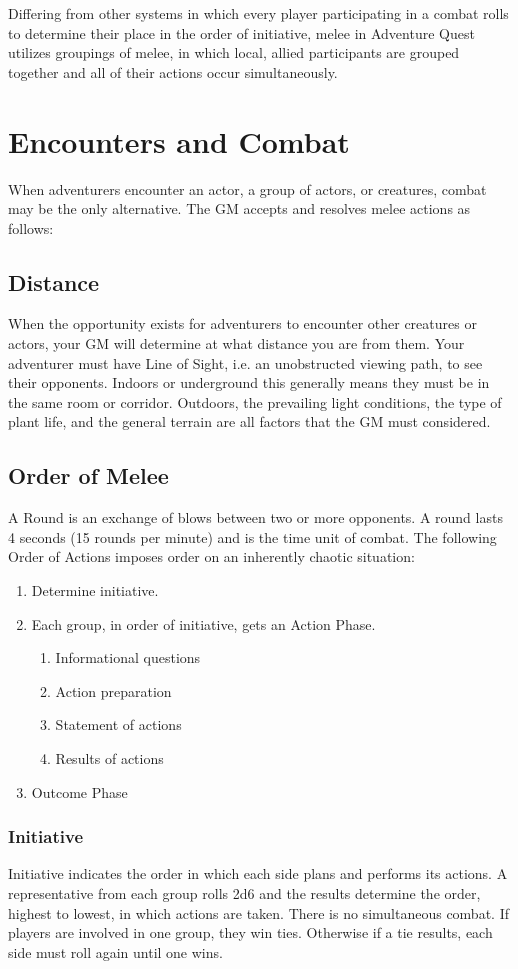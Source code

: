 Differing from other systems in which every player participating in a combat rolls to determine their place in the order of initiative, melee in Adventure Quest utilizes groupings of melee, in which local, allied participants are grouped together and all of their actions occur simultaneously.
\section{Encounters and Combat}
\label{encounter}
When adventurers encounter an actor, a group of actors, or creatures, combat may be the only alternative. The GM accepts and resolves melee actions as follows:
\subsection{Distance}

When the opportunity exists for adventurers to encounter other creatures or actors, your GM will determine at what distance you are from them. Your adventurer must have Line of Sight, i.e. an unobstructed viewing path, to see their opponents. Indoors or underground this generally means they must be in the same room or corridor. Outdoors, the prevailing light conditions, the type of plant life, and the general terrain are all factors that the GM must considered.
\subsection{Order of Melee}

A Round is an exchange of blows between two or more opponents. A round lasts 4 seconds (15 rounds per minute) and is the time unit of combat. The following Order of Actions imposes order on an inherently chaotic situation:
\begin{enumerate}
\item Determine initiative.
\item Each group, in order of initiative, gets an Action Phase.
\begin{enumerate}
\item Informational questions
\item Action preparation
\item Statement of actions
\item Results of actions
\end{enumerate}
\item Outcome Phase
\end{enumerate}
\subsubsection{Initiative}
Initiative indicates the order in which each side plans and performs its actions. A representative from each group rolls 2d6 and the results determine the order, highest to lowest, in which actions are taken. There is no simultaneous combat. If players are involved in one group, they win ties. Otherwise if a tie results, each side must roll again until one wins.

